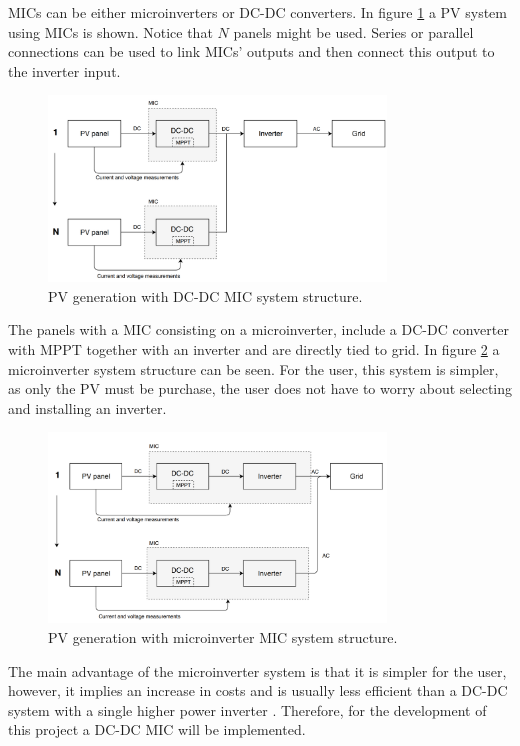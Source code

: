 MICs can be either microinverters or DC-DC converters. In figure \ref{MIC_dcdc} a PV system using MICs is shown. Notice that $N$ panels might be used. Series or parallel connections can be used to link MICs' outputs and then connect this output to the inverter input.

\begin{figure}[H]
	\begin{center}
		\includegraphics[width=0.8\textwidth]{../Pictures/MIC_dcdc}
		\caption{PV generation with DC-DC MIC system structure.}
		\label{MIC_dcdc}
	\end{center}	
\end{figure}

The panels with a MIC consisting on a microinverter, include a DC-DC converter with MPPT together with an inverter and are directly tied to grid. In figure \ref{microinverter_system} a microinverter system structure can be seen. For the user, this system is simpler, as only the PV must be purchase, the user does not have to worry about selecting and installing an inverter. 

\begin{figure}[H]
	\begin{center}
	\includegraphics[width=0.8\textwidth]{../Pictures/MIC_microinverter}
		\caption{PV generation with microinverter MIC system structure.}
		\label{microinverter_system}
	\end{center}	
\end{figure}

The main advantage of the microinverter system is that it is simpler for the user, however, it implies an increase in costs and is usually less efficient than a DC-DC system with a single higher power inverter \cite{ArchitectureMIC}. Therefore, for the development of this project a DC-DC MIC will be implemented.